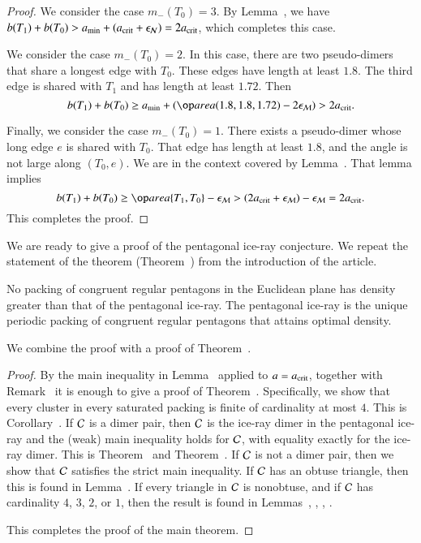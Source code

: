 \begin{proof}
We consider the case $m_-(T_0)= 3$.  By Lemma~, we have
$b(T_1) + b(T_0) > a_\text{min} + (a_\text{crit} + \epsilon_{\mathcal N}) = 2a_\text{crit}$, which completes
this case.

We consider the case $m_-(T_0)=2$.  In this case, there are two
pseudo-dimers that share a longest edge with $T_0$.  These edges have
length at least $1.8$. The third edge is shared with $T_1$ and has
length at least $1.72$.  Then
\[
b(T_1)+b(T_0) 
\ge \ao + (\area (1.8,1.8,1.72) - 2\epsM) > 2\acrit.
\]

Finally, we consider the case $m_-(T_0)=1$.  There exists a
pseudo-dimer whose long edge $e$ is shared with $T_0$.  That edge has
length at least $1.8$, and the angle is not large along $(T_0,e)$. We
are in the context covered by Lemma~.  That lemma
implies
\[
b(T_1) + b(T_0) \ge \area\{T_1,T_0\} - \epsM 
> (2\acrit  +\epsM) - \epsM = 2\acrit.
\]
This completes the proof.
\end{proof}

We are ready to give a proof of the pentagonal ice-ray conjecture. We
repeat the statement of the theorem (Theorem~) from the
introduction of the article.

\begin{theorem}   
  No packing of congruent regular pentagons in the Euclidean plane has
  density greater than that of the pentagonal ice-ray.  The pentagonal
  ice-ray is the unique periodic packing of congruent regular
  pentagons that attains optimal density.
\end{theorem}

We combine the proof with a proof of Theorem~.

\begin{proof}
  By the main inequality in Lemma~ applied to
  $a=a_\text{crit}$, together with Remark~ it is enough to
  give a proof of Theorem~.  Specifically, we show that
  every cluster in every saturated packing is finite of cardinality at
  most $4$.  This is Corollary~.  If $\mathcal C$ is a dimer
  pair, then $\mathcal C$ is the ice-ray dimer in the pentagonal ice-ray and
  the (weak) main inequality holds for $\mathcal C$, with equality exactly for
  the ice-ray dimer.  This is Theorem~ and
  Theorem~.  If $\mathcal C$ is not a dimer pair, then we
  show that $\mathcal C$ satisfies the strict main inequality.  If $\mathcal C$ has an
  obtuse triangle, then this is found in Lemma~.  If
  every triangle in $\mathcal C$ is nonobtuse, and if $\mathcal C$ has cardinality
  $4$, $3$, $2$, or $1$, then the result is found in
  Lemmas~, , ,
  .

  This completes the proof of the main theorem.
\end{proof}



